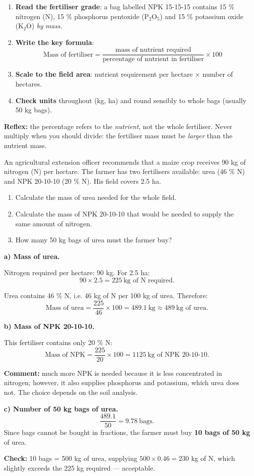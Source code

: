 \documentclass[11pt]{article}
\begin{document}
\begin{methode}
\begin{enumerate}
\item \textbf{Read the fertiliser grade}: a bag labelled NPK 15-15-15 contains 15 \% nitrogen (N), 15 \% phosphorus pentoxide (P$_{2}$O$_{5}$) and 15 \% potassium oxide (K$_{2}$O) \emph{by mass}.
\item \textbf{Write the key formula}:
\[ \text{Mass of fertiliser} = \frac{\text{mass of nutrient required}}{\text{percentage of nutrient in fertiliser}} \times 100 \]
\item \textbf{Scale to the field area}: nutrient requirement per hectare $\times$ number of hectares.
\item \textbf{Check units} throughout (kg, ha) and round sensibly to whole bags (usually 50 kg bags).
\end{enumerate}
\textbf{Reflex:} the percentage refers to the \emph{nutrient}, not the whole fertiliser. Never multiply when you should divide: the fertiliser mass must be \emph{larger} than the nutrient mass.
\end{methode}

\begin{exoresolu}
An agricultural extension officer recommends that a maize crop receives 90 kg of nitrogen (N) per hectare. The farmer has two fertilisers available: urea (46 \% N) and NPK 20-10-10 (20 \% N). His field covers 2.5 ha.
\begin{enumerate}
\item[a)] Calculate the mass of urea needed for the whole field.
\item[b)] Calculate the mass of NPK 20-10-10 that would be needed to supply the same amount of nitrogen.
\item[c)] How many 50 kg bags of urea must the farmer buy?
\end{enumerate}
\tcblower
\textbf{a) Mass of urea.}

Nitrogen required per hectare: 90 kg. For 2.5 ha:
\[ 90 \times 2.5 = 225 \ \text{kg of N required.} \]

Urea contains 46 \% N, i.e. 46 kg of N per 100 kg of urea. Therefore:
\[ \text{Mass of urea} = \frac{225}{46} \times 100 = 489.1 \ \text{kg} \approx 489 \ \text{kg of urea.} \]

\textbf{b) Mass of NPK 20-10-10.}

This fertiliser contains only 20 \% N:
\[ \text{Mass of NPK} = \frac{225}{20} \times 100 = 1125 \ \text{kg of NPK 20-10-10.} \]

\textbf{Comment:} much more NPK is needed because it is less concentrated in nitrogen; however, it also supplies phosphorus and potassium, which urea does not. The choice depends on the soil analysis.

\textbf{c) Number of 50 kg bags of urea.}
\[ \frac{489.1}{50} = 9.78 \ \text{bags.} \]
Since bags cannot be bought in fractions, the farmer must buy \textbf{10 bags of 50 kg} of urea.

\textbf{Check:} 10 bags = 500 kg of urea, supplying $500 \times 0.46 = 230$ kg of N, which slightly exceeds the 225 kg required — acceptable.
\end{exoresolu}
\end{document}
